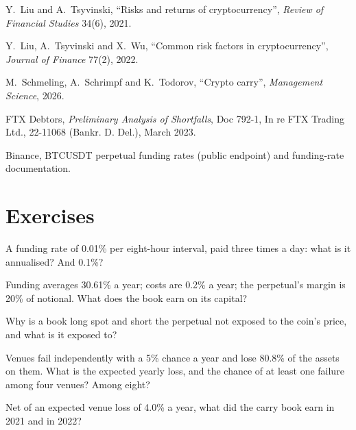 \begin{omsources}
\item Y.~Liu and A.~Tsyvinski, ``Risks and returns of cryptocurrency'', \emph{Review of Financial Studies} 34(6), 2021.
\item Y.~Liu, A.~Tsyvinski and X.~Wu, ``Common risk factors in cryptocurrency'', \emph{Journal of Finance} 77(2), 2022.
\item M.~Schmeling, A.~Schrimpf and K.~Todorov, ``Crypto carry'', \emph{Management Science}, 2026.
\item FTX Debtors, \emph{Preliminary Analysis of Shortfalls}, Doc 792-1, In re FTX Trading Ltd., 22-11068 (Bankr. D. Del.), March 2023.
\item Binance, BTCUSDT perpetual funding rates (public endpoint) and funding-rate documentation.
\end{omsources}

\section{Exercises}

\begin{exercise}[$\star$]\label{exo:s1:crypto-medium-frequency-strategies:1}
A funding rate of 0.01\% per eight-hour interval, paid three times a day: what is it annualised? And 0.1\%?
\end{exercise}

\begin{exercise}[$\star$]\label{exo:s1:crypto-medium-frequency-strategies:2}
Funding averages 30.61\% a year; costs are 0.2\% a year; the perpetual's margin is 20\% of notional. What does the book earn on its capital?
\end{exercise}

\begin{exercise}[$\star$]\label{exo:s1:crypto-medium-frequency-strategies:3}
Why is a book long spot and short the perpetual not exposed to the coin's price, and what is it exposed to?
\end{exercise}

\begin{exercise}[$\star\star$]\label{exo:s1:crypto-medium-frequency-strategies:4}
Venues fail independently with a 5\% chance a year and lose 80.8\% of the assets on them. What is the expected yearly loss, and the chance of at least
one failure among four venues? Among eight?
\end{exercise}

\begin{exercise}[$\star\star$]\label{exo:s1:crypto-medium-frequency-strategies:5}
Net of an expected venue loss of 4.0\% a year, what did the carry book earn in 2021 and in 2022?
\end{exercise}

